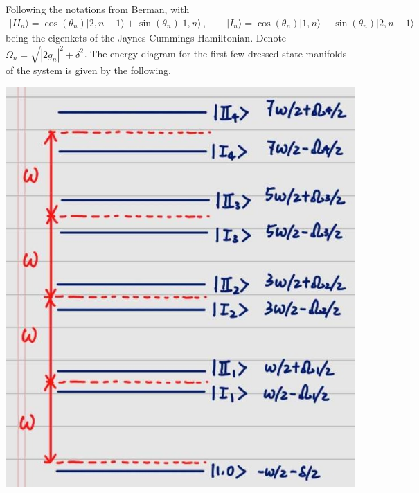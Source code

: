 \documentclass[11pt, oneside]{book}
\theoremstyle{break}
\theoremstyle{break}
\begin{document}
\chapter{}
Following the notations from Berman, with 
\begin{align*}
|II_n\rangle = \cos(\theta_n) |2,n-1\rangle + \sin(\theta_n) |1,n\rangle\,,\qquad
|I_n\rangle = \cos(\theta_n) |1,n\rangle - \sin(\theta_n) |2,n-1\rangle
\end{align*}
being the eigenkets of the Jaynes-Cummings Hamiltonian. Denote $\Omega_ n =\sqrt{|2g_n|^2 + \delta^2}$. The energy diagram for the first few dressed-state manifolds of the system is given by the following.
\begin{center}
\includegraphics[scale=0.39]{542HW6/3}
\end{center}
\end{document}
